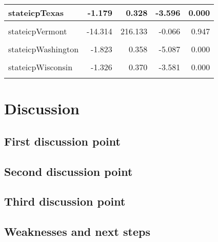 \documentclass[
]{article}
\begin{document}
\begin{table}
\begin{tabular}[t]{l|r|r|r|r}
\hline
stateicpTexas & -1.179 & 0.328 & -3.596 & 0.000\\
\hline
\cellcolor{gray!6}{stateicpUtah} & \cellcolor{gray!6}{-0.258} & \cellcolor{gray!6}{0.468} & \cellcolor{gray!6}{-0.552} & \cellcolor{gray!6}{0.581}\\
\hline
stateicpVermont & -14.314 & 216.133 & -0.066 & 0.947\\
\hline
\cellcolor{gray!6}{stateicpVirginia} & \cellcolor{gray!6}{-1.208} & \cellcolor{gray!6}{0.362} & \cellcolor{gray!6}{-3.338} & \cellcolor{gray!6}{0.001}\\
\hline
stateicpWashington & -1.823 & 0.358 & -5.087 & 0.000\\
\hline
\cellcolor{gray!6}{stateicpWest Virginia} & \cellcolor{gray!6}{-0.508} & \cellcolor{gray!6}{0.584} & \cellcolor{gray!6}{-0.870} & \cellcolor{gray!6}{0.385}\\
\hline
stateicpWisconsin & -1.326 & 0.370 & -3.581 & 0.000\\
\hline
\cellcolor{gray!6}{stateicpWyoming} & \cellcolor{gray!6}{-0.802} & \cellcolor{gray!6}{0.692} & \cellcolor{gray!6}{-1.158} & \cellcolor{gray!6}{0.247}\\
\hline
\end{tabular}
\end{table}

\hypertarget{discussion}{%
\section{Discussion}\label{discussion}}

\hypertarget{first-discussion-point}{%
\subsection{First discussion point}\label{first-discussion-point}}

\hypertarget{second-discussion-point}{%
\subsection{Second discussion point}\label{second-discussion-point}}

\hypertarget{third-discussion-point}{%
\subsection{Third discussion point}\label{third-discussion-point}}

\hypertarget{weaknesses-and-next-steps}{%
\subsection{Weaknesses and next steps}\label{weaknesses-and-next-steps}}
\end{document}
